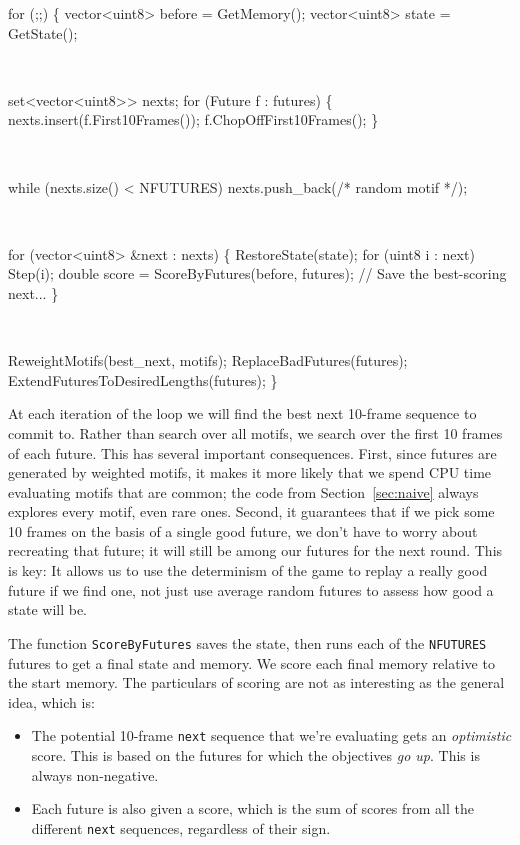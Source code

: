 \documentclass[twocolumn]{article}
\begin{document}
\begin{code}
for (;;) \{
  vector<uint8> before = GetMemory();
  vector<uint8> state = GetState();

 \ 

  set<vector<uint8>> nexts;
  for (Future f : futures) \{
   nexts.insert(f.First10Frames());
   f.ChopOffFirst10Frames();
  \}

 \ 

  while (nexts.size() < NFUTURES)
    nexts.push\_back(/* random motif */);

 \ 

  for (vector<uint8> &next : nexts) \{
    RestoreState(state);
    for (uint8 i : next) Step(i);
    double score =
      ScoreByFutures(before, futures);
    // Save the best-scoring next...
  \}

 \ 

  ReweightMotifs(best\_next, motifs);
  ReplaceBadFutures(futures);
  ExtendFuturesToDesiredLengths(futures);
\}
\end{code}

At each iteration of the loop we will find the best next 10-frame
sequence to commit to. Rather than search over all motifs, we search
over the first 10 frames of each future. This has several important
consequences. First, since futures are generated by weighted motifs,
it makes it more likely that we spend CPU time evaluating motifs that
are common; the code from Section~\ref{sec:naive} always explores
every motif, even rare ones. Second, it guarantees that if we pick
some 10 frames on the basis of a single good future, we don't have to
worry about recreating that future; it will still be among our futures
for the next round. This is key: It allows us to use the determinism
of the game to replay a really good future if we find one, not just
use average random futures to assess how good a state will be.

The function {\tt ScoreByFutures} saves the state, then runs each
of the {\tt NFUTURES} futures to get a final state and memory. We
score each final memory relative to the start memory. The particulars
of scoring are not as interesting as the general idea, which is:
\begin{itemize}
\item The potential 10-frame {\tt next} sequence that we're
evaluating gets an {\em optimistic} score. This is based on the futures
for which the objectives {\em go up}. This is always non-negative.
\item Each future is also given a score, which is the sum of scores
from all the different {\tt next} sequences, regardless of their sign.
\end{itemize}
\end{document}

